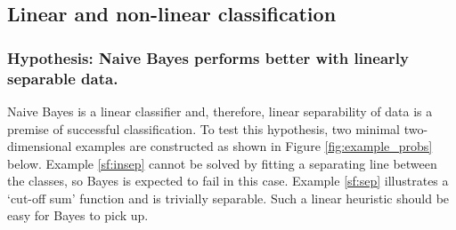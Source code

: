\documentclass[12pt,a4paper,notitlepage,twoside]{scrbook}
\begin{document}
\subsection{Linear and non-linear classification}
\subsubsection*{Hypothesis: Naive Bayes performs better with linearly separable data.}

Naive Bayes is a linear classifier and, therefore, linear separability of data is a
premise of successful classification. To test this hypothesis, two minimal two-dimensional
examples are constructed as shown in Figure \ref{fig:example_probs} below.
Example \ref{sf:insep} cannot be solved by fitting a separating line between the
classes, so Bayes is expected to fail in this case. Example \ref{sf:sep} illustrates a
`cut-off sum' function and is trivially separable. Such a linear heuristic should be easy
for Bayes to pick up.
\end{document}

